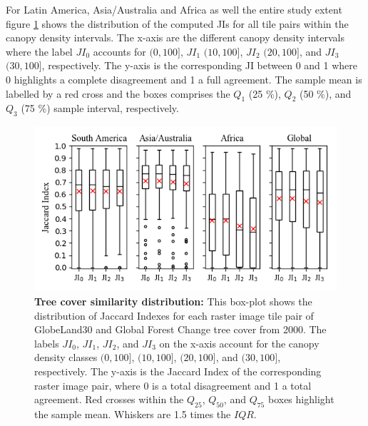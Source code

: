 			For Latin America, Asia/Australia and Africa as well the entire study extent figure \ref{fig:jaccard} shows the distribution of the computed \acp{JI} for all tile pairs within the canopy density intervals. The x-axis are the different canopy density intervals where the label $JI_0$ accounts for $(0,100]$, $JI_1$ $(10,100]$, $JI_2$ $(20,100]$, and $JI_3$ $(30,100]$, respectively. The y-axis is the corresponding \ac{JI} between 0 and 1 where 0 highlights a complete disagreement and 1 a full agreement. The sample mean is labelled by a red cross and the boxes comprises the $Q_1$ (25 \%), $Q_2$ (50 \%), and $Q_3$ (75 \%) sample interval, respectively.
			\begin{figure}[ht]
				\centering
				\includegraphics[scale=.91]{img/jaccard}
				\caption[Tree cover similarity distribution]{\textbf{Tree cover similarity distribution:} This box-plot shows the distribution of Jaccard Indexes for each raster image tile pair of GlobeLand30 and Global Forest Change tree cover from 2000. The labels $JI_0$, $JI_1$, $JI_2$, and $JI_3$ on the x-axis account for the canopy density classes $(0,100]$, $(10,100]$, $(20,100]$, and $(30,100]$, respectively. The y-axis is the Jaccard Index of the corresponding raster image pair, where 0 is a total disagreement and 1 a total agreement. Red crosses within the $Q_{25}$, $Q_{50}$, and $Q_{75}$ boxes highlight the sample mean. Whiskers are 1.5 times the $IQR$.}
				\label{fig:jaccard}
			\end{figure}

